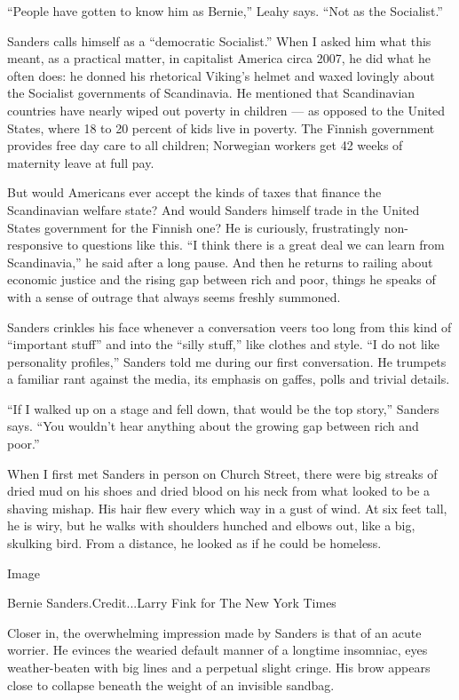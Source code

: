 ``People have gotten to know him as Bernie,'' Leahy says. ``Not as the
Socialist.''

Sanders calls himself as a ``democratic Socialist.'' When I asked him
what this meant, as a practical matter, in capitalist America circa
2007, he did what he often does: he donned his rhetorical Viking's
helmet and waxed lovingly about the Socialist governments of
Scandinavia. He mentioned that Scandinavian countries have nearly wiped
out poverty in children --- as opposed to the United States, where 18 to
20 percent of kids live in poverty. The Finnish government provides free
day care to all children; Norwegian workers get 42 weeks of maternity
leave at full pay.

But would Americans ever accept the kinds of taxes that finance the
Scandinavian welfare state? And would Sanders himself trade in the
United States government for the Finnish one? He is curiously,
frustratingly non-responsive to questions like this. ``I think there is
a great deal we can learn from Scandinavia,'' he said after a long
pause. And then he returns to railing about economic justice and the
rising gap between rich and poor, things he speaks of with a sense of
outrage that always seems freshly summoned.

Sanders crinkles his face whenever a conversation veers too long from
this kind of ``important stuff'' and into the ``silly stuff,'' like
clothes and style. ``I do not like personality profiles,'' Sanders told
me during our first conversation. He trumpets a familiar rant against
the media, its emphasis on gaffes, polls and trivial details.

``If I walked up on a stage and fell down, that would be the top
story,'' Sanders says. ``You wouldn't hear anything about the growing
gap between rich and poor.''

When I first met Sanders in person on Church Street, there were big
streaks of dried mud on his shoes and dried blood on his neck from what
looked to be a shaving mishap. His hair flew every which way in a gust
of wind. At six feet tall, he is wiry, but he walks with shoulders
hunched and elbows out, like a big, skulking bird. From a distance, he
looked as if he could be homeless.

Image

Bernie Sanders.Credit...Larry Fink for The New York Times

Closer in, the overwhelming impression made by Sanders is that of an
acute worrier. He evinces the wearied default manner of a longtime
insomniac, eyes weather-beaten with big lines and a perpetual slight
cringe. His brow appears close to collapse beneath the weight of an
invisible sandbag.

